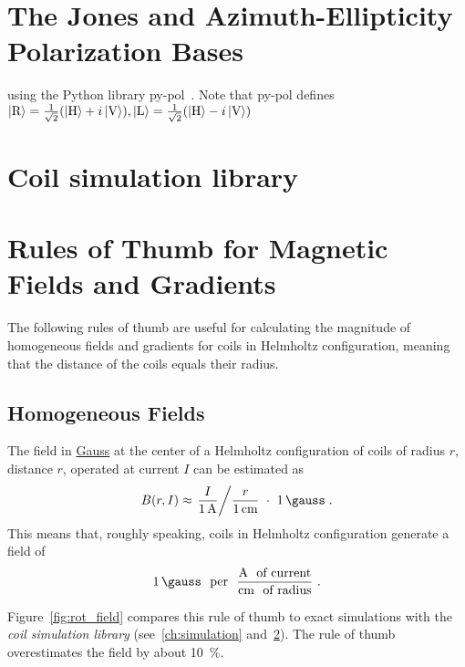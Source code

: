 \renewcommand{\imagepath}{../90-appendix/img}

\appendix
\chapter{The Jones and Azimuth-Ellipticity Polarization Bases}\label{ch:pypol_trafos}

using the Python library py-pol~\cite{noauthor_python_nodate}. Note that py-pol defines $\Ket{\text{R}} = \frac{1}{\sqrt{2}}(\Ket{\text{H}}+i\Ket{\text{V}}), \Ket{\text{L}} = \frac{1}{\sqrt{2}}(\Ket{\text{H}}-i\Ket{\text{V}})$

\chapter{Coil simulation library}\label{ch:coil_simulation_library}


\chapter{Rules of Thumb for Magnetic Fields and Gradients}
The following rules of thumb are useful for calculating the magnitude of homogeneous fields and gradients for coils in Helmholtz configuration, meaning that the distance of the coils equals their radius.

\section*{Homogeneous Fields}
The field in \href{https://www.youtube.com/watch?v=_3_JVVs2Kls}{Gauss} at the center of a Helmholtz configuration of coils of radius $r$, distance $r$, operated at current $I$ can be estimated as
\begin{align}\label{eq:rot_field}
    B(r, I) \approx \left. \frac{I}{\SI{1}{\ampere}} \middle/ \frac{r}{\SI{1}{\centi\meter}} ~ \cdot ~\SI{1}{\gauss}\right. .
\end{align}
This means that, roughly speaking, coils in  Helmholtz configuration generate a field of
\begin{align}\nonumber
    \SI{1}{\gauss} ~~ \text{per} ~~ \frac{\si{\ampere} ~~ \text{of current}}{\si{\centi\meter} ~~ \text{of radius}}~.
\end{align}

Figure~\ref{fig:rot_field} compares this rule of thumb to exact simulations with the \textit{coil simulation library} (see~\ref{ch:simulation} and~\ref{ch:coil_simulation_library}). The rule of thumb overestimates the field by about \SI{10}{\percent}.

